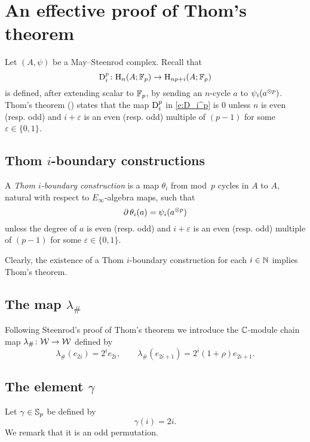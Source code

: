 
\appendix
\section{An effective proof of Thom's theorem}\label{s:thom}


Let $(A,\psi)$ be a May--Steenrod complex.
Recall that
\[
\mathrm{D}_i^p \colon \mathrm{H}_n(A; {\mathbb{F}_p}) \to \mathrm{H}_{np+i}(A; {\mathbb{F}_p})
\]
is defined, after extending scalar to ${\mathbb{F}_p}$, by sending an $n$-cycle $a$ to $\psi_i(a^{\otimes p})$.
Thom's theorem (\cite[218]{steenrod1953cyclic}) states that the map $\mathrm{D}_i^p$ in \eqref{e:D_i^p} is $0$ unless $n$ is even (resp. odd) and $i+\varepsilon$ is an even (resp. odd) multiple of $(p-1)$ for some $\varepsilon \in \{0,1\}$.

\subsection{Thom $i$-boundary constructions}

A \textit{Thom $i$-boundary construction} is a map $\theta_i$ from mod~$p$ cycles in $A$ to $A$, natural with respect to $E_\infty$-algebra maps, such that
\[
\operatorname{\partial} \theta_i(a) = \psi_i(a^{\otimes p})
\]
unless the degree of $a$ is even (resp. odd) and $i+\varepsilon$ is an even (resp. odd) multiple of $(p-1)$ for some $\varepsilon \in \{0,1\}$.

Clearly, the existence of a Thom $i$-boundary construction for each $i \in \mathbb{N}$ implies Thom's theorem.

\subsection{The map $\lambda_\#$}

Following Steenrod's proof of Thom's theorem we introduce the $\mathbb{C}$-module chain map $\lambda_\# \colon \mathcal{W} \to \mathcal{W}$ defined by
\[
\lambda_\#(e_{2i}) = 2^i e_{2i}, \qquad
\lambda_\#(e_{2i+1}) = 2^i (1 + \rho) e_{2i+1}.
\]

\subsection{The element $\gamma$}

Let $\gamma \in \mathbb{S}_p$ be defined by
\[
\gamma(i) = 2i.
\]
We remark that it is an odd permutation.

